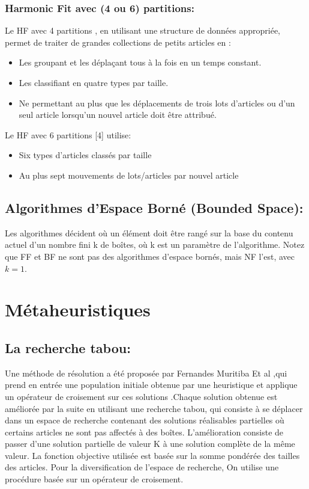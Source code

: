 \documentclass[class=report, crop=false]{standalone}
\begin{document}
        \subsubsection{Harmonic Fit avec (4 ou 6) partitions: }
        Le HF avec 4 partitions \cite{man1996approximation}, en utilisant une structure de données appropriée, permet de traiter de grandes collections de petits articles en :
        \renewcommand{\labelitemi}{$\circ$}  
        \begin{itemize}
            \item Les groupant et les déplaçant tous à la fois en un temps constant.
            \item Les classifiant en quatre types par taille.
            \item Ne permettant au plus que les déplacements de trois lots d’articles ou d'un seul article lorsqu'un nouvel article doit être attribué.
        \end{itemize}
        Le HF avec 6 partitions [4] utilise:
        \renewcommand{\labelitemi}{$\circ$}  
        \begin{itemize}
            \item Six types d'articles classés par taille
            \item Au plus sept mouvements de lots/articles par nouvel article
        \end{itemize}
        \subsection{Algorithmes d’Espace Borné (Bounded Space):}
        Les algorithmes décident où un élément doit être rangé sur la base du contenu actuel d'un nombre fini k de boîtes, où k est un paramètre de l'algorithme. Notez que FF et BF ne sont pas des algorithmes d'espace bornés, mais NF l'est, avec \(k = 1\).
        \section{Métaheuristiques}
        \subsection{La recherche tabou: }
        Une méthode de résolution a été proposée par Fernandes Muritiba Et al \cite{mannai2018guided} ,qui prend en entrée une population initiale obtenue par une heuristique et applique un opérateur de croisement sur ces solutions .Chaque solution obtenue est améliorée par la suite en utilisant une recherche tabou, qui consiste à  se déplacer dans un espace de recherche contenant des solutions réalisables  partielles où certains articles ne sont pas affectés à des boîtes. L’amélioration consiste de passer d’une solution partielle de valeur K à une solution complète de la même valeur. La fonction objective utilisée est basée sur la somme pondérée des tailles des articles.
Pour la diversification de l’espace de recherche, On utilise une procédure basée sur un opérateur de croisement.
\end{document}
